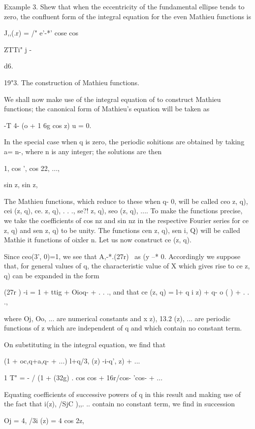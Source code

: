 Example 3. Shew that when the eccentricity of the fundamental ellipse
tends to zero, the confluent form of the integral equation for the
even Mathieu functions is

J,,(.r) = /" e'-*' cose cos

ZTTi" j -

d6.

19"3. The construction of Mathieu functions.

We shall now make use of the integral equation of to construct
Mathieu functions; the canonical form of Mathieu's equation will be
taken as

-T 4- (o + 1 6g cos z) u = 0.

%
%

In the special case when q is zero, the periodic sohitions are
obtained by taking a= n-, where n is any integer; the solutions are
then

1, cos ', cos 22, ...,

sin z, sin z,

The Mathieu functions, which reduce to these when q- 0, will be called
ceo z, q), cei (z, q), ce. z, q), . . ., se?! z, q), seo (z, q), ....
To make the functions precise, we take the coefficients of cos nz and
sin nz in the respective Fourier series for ce z, q) and sen z, q) to
be unity. The functions cen z, q), sen i, Q) will be called Mathie it
functions of oixler n. Let us now construct ce (z, q).

Since ceo(3', 0)=1, we see that A,-*.(27r)~ as (y --* 0. Accordingly
we suppose that, for general values of q, the characteristic value of
X which gives rise to ce z, q) can be expanded in the form

(27r ) -i = 1 + ttig + Oioq- + . . ., and that ce (z, q) = l+ q i z)
+ q- o ( ) + . . .,

where Oj, Oo, ... are numerical constants and x z), 13.2 (z), ... are
periodic functions of z which are independent of q and which contain
no constant term.

On substituting in the integral equation, we find that

(1 + oc,q+a,q- + ...) l+q/3, (z) -i-q', z) + ...

1 T" = - / (1 + \/(32g) . cos cos + 16r/cos- 'cos- + ...

Equating coefficients of successive powers of q in this result and
making use of the fact that i(z), /SjC ),,. .. contain no constant
term, we find in succession

Oj = 4, /3i (z) = 4 cos 2z,

